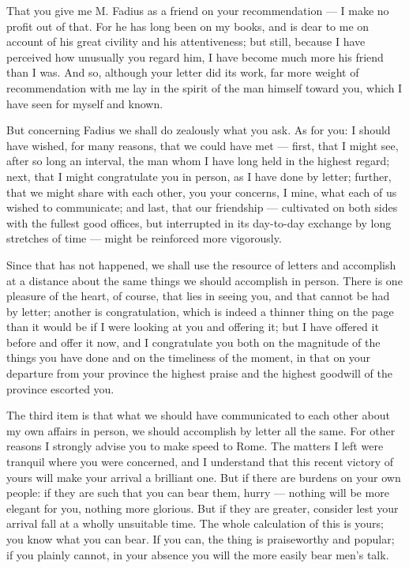 

 That you give me M. Fadius as a friend on your recommendation --- I make no profit out of that. For he has long been on my books, and is dear to me on account of his great civility and his attentiveness; but still, because I have perceived how unusually you regard him, I have become much more his friend than I was. And so, although your letter did its work, far more weight of recommendation with me lay in the spirit of the man himself toward you, which I have seen for myself and known.

 But concerning Fadius we shall do zealously what you ask. As for you: I should have wished, for many reasons, that we could have met --- first, that I might see, after so long an interval, the man whom I have long held in the highest regard; next, that I might congratulate you in person, as I have done by letter; further, that we might share with each other, you your concerns, I mine, what each of us wished to communicate; and last, that our friendship --- cultivated on both sides with the fullest good offices, but interrupted in its day-to-day exchange by long stretches of time --- might be reinforced more vigorously.

 Since that has not happened, we shall use the resource of letters and accomplish at a distance about the same things we should accomplish in person. There is one pleasure of the heart, of course, that lies in seeing you, and that cannot be had by letter; another is congratulation, which is indeed a thinner thing on the page than it would be if I were looking at you and offering it; but I have offered it before and offer it now, and I congratulate you both on the magnitude of the things you have done and on the timeliness of the moment, in that on your departure from your province the highest praise and the highest goodwill of the province escorted you.

 The third item is that what we should have communicated to each other about my own affairs in person, we should accomplish by letter all the same. For other reasons I strongly advise you to make speed to Rome. The matters I left were tranquil where you were concerned, and I understand that this recent victory of yours will make your arrival a brilliant one. But if there are burdens on your own people: if they are such that you can bear them, hurry --- nothing will be more elegant for you, nothing more glorious. But if they are greater, consider lest your arrival fall at a wholly unsuitable time. The whole calculation of this is yours; you know what you can bear. If you can, the thing is praiseworthy and popular; if you plainly cannot, in your absence you will the more easily bear men's talk.

